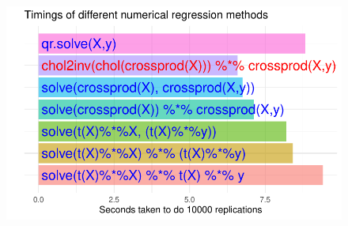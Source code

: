 \documentclass[
  letterpaper,
]{book}
\begin{document}
\begin{figure}[H]

{\centering \includegraphics{LinAlg_files/figure-pdf/unnamed-chunk-17-1.pdf}

}

\end{figure}


\backmatter
\end{document}
